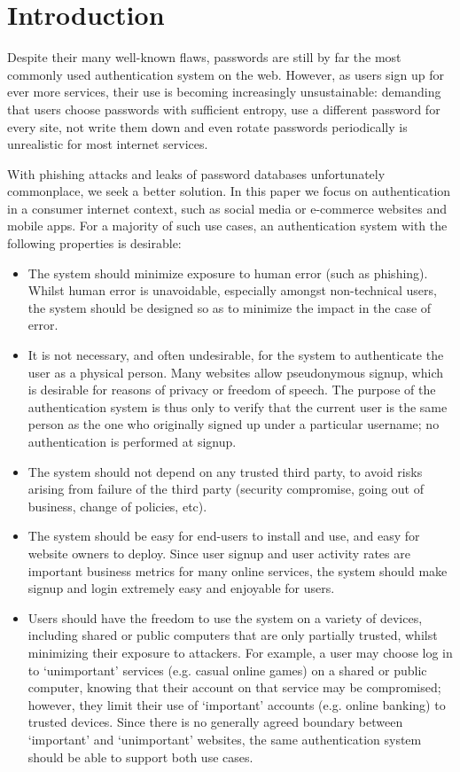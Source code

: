 \section{Introduction}

Despite their many well-known flaws, passwords are still by far the most commonly used
authentication system on the web. However, as users sign up for ever more services, their use is
becoming increasingly unsustainable: demanding that users choose passwords with sufficient entropy,
use a different password for every site, not write them down and even rotate passwords periodically
is unrealistic for most internet services.

With phishing attacks and leaks of password databases unfortunately commonplace, we seek a better
solution. In this paper we focus on authentication in a consumer internet context, such as social
media or e-commerce websites and mobile apps. For a majority of such use cases, an authentication
system with the following properties is desirable:

\begin{itemize}
\item The system should minimize exposure to human error (such as phishing). Whilst human error
is unavoidable, especially amongst non-technical users, the system should be designed so as to
minimize the impact in the case of error.
\item It is not necessary, and often undesirable, for the system to authenticate the user as a
physical person. Many websites allow pseudonymous signup, which is desirable for reasons of privacy
or freedom of speech. The purpose of the authentication system is thus only to verify that the
current user is the same person as the one who originally signed up under a particular username; no
authentication is performed at signup.
\item The system should not depend on any trusted third party, to avoid risks arising from failure
of the third party (security compromise, going out of business, change of policies, etc).
\item The system should be easy for end-users to install and use, and easy for website owners to
deploy. Since user signup and user activity rates are important business metrics for many online
services, the system should make signup and login extremely easy and enjoyable for users.
\item Users should have the freedom to use the system on a variety of devices, including shared or
public computers that are only partially trusted, whilst minimizing their exposure to attackers.
For example, a user may choose log in to `unimportant' services (e.g. casual online games) on a
shared or public computer, knowing that their account on that service may be compromised; however,
they limit their use of `important' accounts (e.g. online banking) to trusted devices. Since there
is no generally agreed boundary between `important' and `unimportant' websites, the same
authentication system should be able to support both use cases.
\end{itemize}

